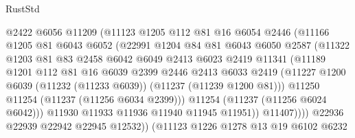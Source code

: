 \begin{lexlean}{RustStd}
\begin{coremodule}
                        @2422
                        @6056
                        @11209
                        (@11123
                          @1205
                          @112
                          @81
                          @16
                          @6054
                          @2446
                          (@11166
                            @1205
                            @81
                            @6043
                            @6052
                            (@22991
                              @1204
                              @84
                              @81
                              @6043
                              @6050
                              @2587
                              (@11322
                                @1203
                                @81
                                @83
                                @2458
                                @6042
                                @6049
                                @2413
                                @6023
                                @2419
                                @11341
                                (@11189
                                  @1201
                                  @112
                                  @81
                                  @16
                                  @6039
                                  @2399
                                  @2446
                                  @2413
                                  @6033
                                  @2419
                                  (@11227
                                    @1200
                                    @6039
                                    (@11232 (@11233 @6039))
                                    (@11237 (@11239 @1200 @81)))
                                  @11250
                                  @11254
                                  (@11237 (@11256 @6034 @2399)))
                                @11254
                                (@11237 (@11256 @6024 @6042)))
                              @11930
                              @11933
                              @11936
                              @11940
                              @11945
                              @11951))
                          @11407))))
                  @22936
                  @22939
                  @22942
                  @22945
                  @12532))
              (@11123
                @1226
                @1278
                @13
                @19
                @6102
                @6232

\end{coremodule}
\end{lexlean}
